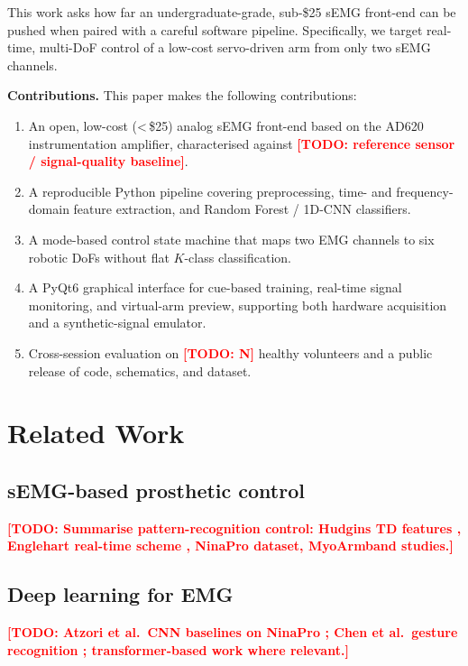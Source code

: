 \documentclass[conference]{IEEEtran}
\newcommand{\todo}[1]{\textcolor{red}{\textbf{[TODO: #1]}}}
\begin{document}
This work asks how far an undergraduate-grade, sub-\$25 sEMG front-end can
be pushed when paired with a careful software pipeline. Specifically, we
target real-time, multi-DoF control of a low-cost servo-driven arm from
only two sEMG channels.

\textbf{Contributions.} This paper makes the following contributions:
\begin{enumerate}
    \item An open, low-cost (\textless\,\$25) analog sEMG front-end based on the AD620 instrumentation amplifier, characterised against \todo{reference sensor / signal-quality baseline}.
    \item A reproducible Python pipeline covering preprocessing, time- and frequency-domain feature extraction, and Random Forest / 1D-CNN classifiers.
    \item A mode-based control state machine that maps two EMG channels to six robotic DoFs without flat $K$-class classification.
    \item A PyQt6 graphical interface for cue-based training, real-time signal monitoring, and virtual-arm preview, supporting both hardware acquisition and a synthetic-signal emulator.
    \item Cross-session evaluation on \todo{N} healthy volunteers and a public release of code, schematics, and dataset.
\end{enumerate}

\section{Related Work}
\label{sec:related}

\subsection{sEMG-based prosthetic control}
\todo{Summarise pattern-recognition control: Hudgins TD features
\cite{hudgins1993new}, Englehart real-time scheme \cite{englehart2003robust},
NinaPro dataset, MyoArmband studies.}

\subsection{Deep learning for EMG}
\todo{Atzori et al.\ CNN baselines on NinaPro \cite{atzori2016deep};
Chen et al.\ gesture recognition \cite{chen2020deep}; transformer-based
work where relevant.}
\end{document}
